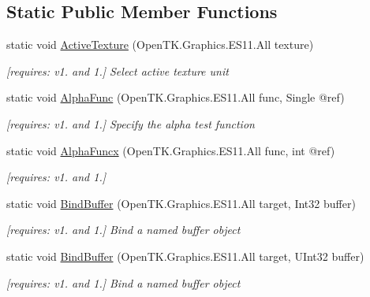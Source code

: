 \subsection*{Static Public Member Functions}
\begin{DoxyCompactItemize}
\item 
static void \hyperlink{class_open_t_k_1_1_graphics_1_1_e_s11_1_1_g_l_a638e38400c456f94e38933751e1e78b3}{Active\-Texture} (Open\-T\-K.\-Graphics.\-E\-S11.\-All texture)
\begin{DoxyCompactList}\small\item\em \mbox{[}requires\-: v1. and 1.\mbox{]} Select active texture unit \end{DoxyCompactList}\item 
static void \hyperlink{class_open_t_k_1_1_graphics_1_1_e_s11_1_1_g_l_ade9d65df8a675a75c9c0904fbde27e52}{Alpha\-Func} (Open\-T\-K.\-Graphics.\-E\-S11.\-All func, Single @ref)
\begin{DoxyCompactList}\small\item\em \mbox{[}requires\-: v1. and 1.\mbox{]} Specify the alpha test function \end{DoxyCompactList}\item 
static void \hyperlink{class_open_t_k_1_1_graphics_1_1_e_s11_1_1_g_l_a8fee1457b176b5aad45575a9d2363f6a}{Alpha\-Funcx} (Open\-T\-K.\-Graphics.\-E\-S11.\-All func, int @ref)
\begin{DoxyCompactList}\small\item\em \mbox{[}requires\-: v1. and 1.\mbox{]}\end{DoxyCompactList}\item 
static void \hyperlink{class_open_t_k_1_1_graphics_1_1_e_s11_1_1_g_l_a3ea03f99a82830f8ed87f7f7bddd74f0}{Bind\-Buffer} (Open\-T\-K.\-Graphics.\-E\-S11.\-All target, Int32 buffer)
\begin{DoxyCompactList}\small\item\em \mbox{[}requires\-: v1. and 1.\mbox{]} Bind a named buffer object \end{DoxyCompactList}\item 
static void \hyperlink{class_open_t_k_1_1_graphics_1_1_e_s11_1_1_g_l_a473e024b8d245f0ad7a0cb0d295b79b7}{Bind\-Buffer} (Open\-T\-K.\-Graphics.\-E\-S11.\-All target, U\-Int32 buffer)
\begin{DoxyCompactList}\small\item\em \mbox{[}requires\-: v1. and 1.\mbox{]} Bind a named buffer object \end{DoxyCompactList}\item 

\end{DoxyCompactItemize}
